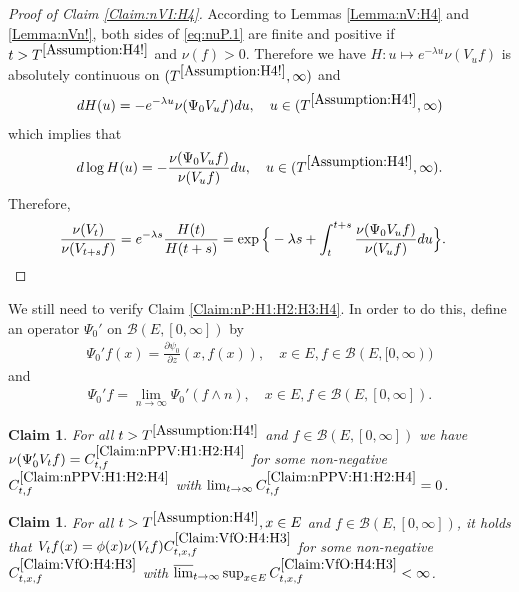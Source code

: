 \documentclass[12pt,a4paper]{amsart}
\numberwithin{equation}{section}
\theoremstyle{plain}
\newtheorem{claim}[thm]{Claim}
\theoremstyle{definition}
\theoremstyle{remark}
\newcounter{N}
\newcounter{n}[N]
\begin{document}
\begin{proof}[{Proof of Claim \ref{Claim:nVI:H4}}]
According to Lemmas \ref{Lemma:nV:H4} and \ref{Lemma:nVn!}, both sides of \eqref{eq:nuP.1} are finite and positive if $t> T^{\ref{Assumption:H4!}}$ and $\nu(f)>0$.
Therefore we have $H: u\mapsto e^{-\lambda u}\nu(V_u f)$ is absolutely continuous on $(T^{\ref{Assumption:H4!}},\infty)$ and
\begin{align}
  d H(u)
  = - e^{- \lambda u} \nu(\Psi_0 V_u f) du,
  \quad u\in (T^{\ref{Assumption:H4!}},\infty)
  \end{align}
 which implies that
\begin{align}
  d \log H(u)
  = - \frac{\nu(\Psi_0 V_u f )}{ \nu(V_u f)} du,
  \quad u \in (T^{\ref{Assumption:H4!}},\infty).
  \end{align}
Therefore,
\begin{align}
  & \frac{\nu(V_t)}{ \nu(V_{t+s}f)}
  = e^{- \lambda s} \frac{H(t)}{H(t+s)}
  = \exp\Big\{-\lambda s + \int_t^{t+s} \frac{\nu(\Psi_0 V_u f)}{ \nu(V_u f)} du\Big\}.
  \qedhere
  \end{align}
\end{proof}
We still need to verify Claim \ref{Claim:nP:H1:H2:H3:H4}.
In order to do this, define an operator $\Psi_0'$ on $\mathcal B(E,[0,\infty])$ by
\begin{align}
\Psi_0' f(x)
= \frac{\partial \psi_0}{ \partial z} (x, f(x)),
\quad x\in E, f\in \mathcal B(E,[0,\infty))
\end{align}
and 
\begin{align}
\Psi_0' f
= \lim_{n\to \infty} \Psi_0'(f\wedge n),
\quad x\in E, f\in \mathcal B(E,[0,\infty]).
\end{align}
\begin{claim} \label{Claim:nPPV:H1:H2:H4}
For all $t > T^{\ref{Assumption:H4!}}$ and $f\in \mathcal B(E,[0,\infty])$ we have $\nu(\Psi_0' V_t f) = C^{\ref{Claim:nPPV:H1:H2:H4}}_{t,f}$ for some non-negative $C^{\ref{Claim:nPPV:H1:H2:H4}}_{t,f}$ with $\lim_{t\to \infty} C^{\ref{Claim:nPPV:H1:H2:H4}}_{t,f} = 0$.
\end{claim}
\begin{claim} \label{Claim:VfO:H4:H3}
For all $t> T^{\ref{Assumption:H4!}}, x\in E$ and $f\in \mathcal B(E,[0,\infty])$, it holds that
$V_t f(x) = \phi(x) \nu(V_tf) C^{\ref{Claim:VfO:H4:H3}}_{t,x,f}$ for some non-negative $C^{\ref{Claim:VfO:H4:H3}}_{t,x,f}$ with $\varlimsup_{t\to \infty} \sup_{x\in E} C^{\ref{Claim:VfO:H4:H3}}_{t,x,f} <\infty$.
\end{claim}
\end{document}
